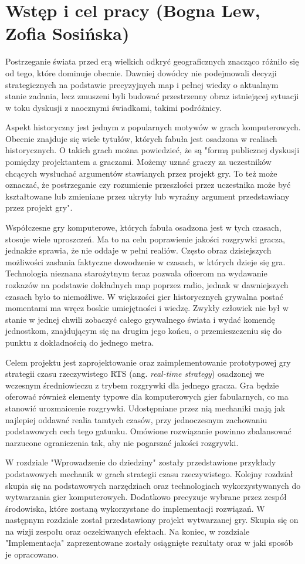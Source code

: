 \chapter{Wstęp i cel pracy (Bogna Lew, Zofia Sosińska)}\label{chap:introduction}

Postrzeganie świata przed erą wielkich odkryć geograficznych znacząco różniło się od tego, które dominuje obecnie. Dawniej
dowódcy nie podejmowali decyzji strategicznych na podstawie precyzyjnych map i pełnej wiedzy o aktualnym stanie zadania,
lecz zmuszeni byli budować przestrzenny obraz istniejącej sytuacji w toku dyskusji z naocznymi świadkami, takimi podróżnicy.

Aspekt historyczny jest jednym z popularnych motywów w grach komputerowych. Obecnie znajduje się wiele tytułów, których
fabuła jest osadzona w realiach historycznych. O takich grach można powiedzieć, że są "formą publicznej dyskusji
pomiędzy projektantem a graczami. Możemy uznać graczy za uczestników chcących wysłuchać argumentów stawianych przez
projekt gry. To też może oznaczać, że postrzeganie czy rozumienie przeszłości przez uczestnika może być kształtowane lub
zmieniane przez ukryty lub wyraźny argument przedstawiany przez projekt gry"\cite{perception_past}.

Współczesne gry komputerowe, których fabuła osadzona jest w tych czasach, stosuje wiele uproszczeń. Ma to na celu poprawienie jakości
rozgrywki gracza, jednakże sprawia, że nie oddaje w pełni realiów. Często obraz dzisiejszych możliwości zasłania faktyczne dowodzenie
w czasach, w których dzieje się gra. Technologia nieznana starożytnym teraz pozwala oficerom na wydawanie rozkazów na podstawie dokładnych map poprzez radio,
jednak w dawniejszych czasach było to niemożliwe. W większości gier historycznych grywalna postać momentami ma wręcz boskie umiejętności i wiedzę. Zwykły człowiek nie był w
stanie w jednej chwili zobaczyć całego grywalnego świata i wydać komendę jednostkom, znajdującym się na drugim jego końcu, o przemieszczeniu
się do punktu z dokładnością do jednego metra.

Celem projektu jest zaprojektowanie oraz zaimplementowanie prototypowej gry strategii czasu rzeczywistego RTS
(ang. \textit{real-time strategy}) osadzonej we wczesnym średniowieczu z trybem rozgrywki dla jednego gracza. Gra będzie
oferować również elementy typowe dla komputerowych gier fabularnych, co ma stanowić urozmaicenie rozgrywki. 
Udostępniane przez nią mechaniki mają jak najlepiej oddawać realia tamtych czasów, przy
jednoczesnym zachowaniu podstawowych cech tego gatunku. Omówione rozwiązanie powinno zbalansować narzucone ograniczenia tak, aby 
nie pogarszać jakości rozgrywki.

W rozdziale "Wprowadzenie do dziedziny" zostały przedstawione przykłady podstawowych mechanik w grach strategii czasu
rzeczywistego. Kolejny rozdział skupia się na podstawowych narzędziach oraz technologiach wykorzystywanych do wytwarzania
gier komputerowych. Dodatkowo precyzuje wybrane przez zespół środowiska, które zostaną wykorzystane do implementacji
rozwiązań. W następnym rozdziale został przedstawiony projekt wytwarzanej gry. Skupia się on na wizji zespołu oraz
oczekiwanych efektach. Na koniec, w rozdziale "Implementacja" zaprezentowane zostały osiągnięte rezultaty oraz w jaki
sposób je opracowano.

